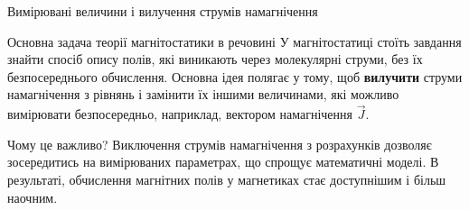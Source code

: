 \documentclass[onlytextwidth]{beamer}
\begin{document}
\begin{frame}{Вимірювані величини і вилучення струмів намагнічення}{}
	\begin{alertblock}{Основна задача теорії магнітостатики в речовині}\justifying
		У магнітостатиці стоїть завдання знайти спосіб опису полів, які виникають через молекулярні струми, без їх безпосереднього обчислення.
		Основна ідея полягає у тому, щоб \textbf{вилучити} струми намагнічення з рівнянь і замінити їх іншими величинами, які можливо вимірювати
		безпосередньо, наприклад, вектором намагнічення $\vec{J}$.
	\end{alertblock}
	\begin{block}{Чому це важливо?}\justifying
		Виключення струмів намагнічення з розрахунків дозволяє зосередитись на вимірюваних параметрах, що спрощує математичні моделі. В результаті,
		обчислення магнітних полів у магнетиках стає доступнішим і більш наочним.
	\end{block}
\end{frame}
\end{document}
